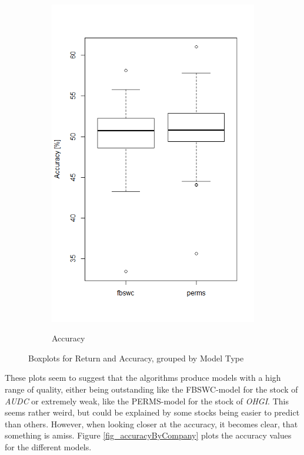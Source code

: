 \begin{figure}[h]
\begin{subfigure}{.5\textwidth}
  \includegraphics[width=\linewidth]{boxplotAccuracy}
  \label{fig_accuracyBoxplot}
  \caption{Accuracy}
\end{subfigure}
\caption{Boxplots for Return and Accuracy, grouped by Model Type}
\label{fig_returnBoxplots}
\end{figure}

These plots seem to suggest that the algorithms produce models with a high range of quality, either being outstanding like the FBSWC-model for the stock of \textit{AUDC} or extremely weak, like the PERMS-model for the stock of \textit{OHGI}. This seems rather weird, but could be explained by some stocks being easier to predict than others. However, when looking closer at the accuracy, it becomes clear, that something is amiss. Figure \ref{fig_accuracyByCompany} plots the accuracy values for the different models. 

